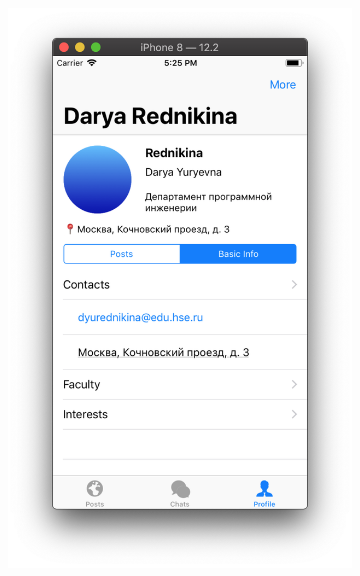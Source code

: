 \documentclass[a4paper,12pt]{article}
\begin{document}
\begin{figure}[h!]
\begin{subfigure}[b]{0.3\linewidth}
		\end{subfigure}
		\begin{subfigure}[b]{0.3\linewidth}
			\includegraphics[width=\linewidth]{../includes/pmi/basic_info.png}
		\end{subfigure}
		\begin{subfigure}[b]{0.3\linewidth}

\end{subfigure}
\end{figure}
\end{document}
